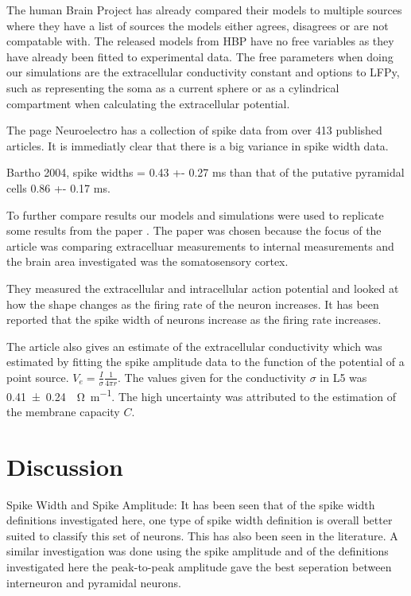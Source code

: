 \documentclass[altfont, fleqn]{uiophd}
\begin{document}
The human Brain Project has already compared their models to multiple sources
where they have a list of sources the models either agrees, disagrees or are not 
compatable with. 
The released models from HBP have no free variables as they have already been fitted
to experimental data. 
The free parameters when doing our simulations are the 
extracellular conductivity constant and options to LFPy, 
such as representing the soma as a current sphere or 
as a cylindrical compartment when calculating the extracellular potential. 

The page Neuroelectro has a collection of spike data from over 413 published 
articles.
It is immediatly clear that there is a big variance in spike width data. 

Bartho 2004, spike widths  = 0.43 +- 0.27 ms than that of the
putative pyramidal cells 0.86 +- 0.17 ms.

To further compare results 
our models and simulations were used to replicate 
some results from the paper
\textcite{anastassiou_cell_2015}.
The paper was chosen because the focus of the article was 
comparing extracelluar measurements to internal measurements
and the brain area investigated was the somatosensory cortex. 

They measured the extracellular and intracellular action potential
and looked at how the shape changes as the firing rate of the neuron 
increases. 
It has been reported that the spike width of neurons
increase as the firing rate increases. 


The article also gives an estimate of the extracellular conductivity
which was estimated by fitting the spike amplitude data to the 
function of the potential of a point source. 
$V_e = \frac{I}{\sigma} \frac{1}{4 \pi r}$. 
The values given for the conductivity $\sigma$ in L5 was 
\SI[separate-uncertainty = true]{0.41 \pm 0.24}{\per\ohm\per\metre}.
The high uncertainty was attributed to the estimation of 
the membrane capacity $C$.

\chapter{Discussion}

Spike Width and Spike Amplitude:
It has been seen that of the spike width definitions investigated here, 
one type of spike width definition is overall
better suited to classify this set of neurons. 
This has also been seen in the literature. 
A similar investigation was done using the spike amplitude and of the
definitions investigated here the peak-to-peak amplitude gave the best
seperation between interneuron and pyramidal neurons. 
\end{document}
